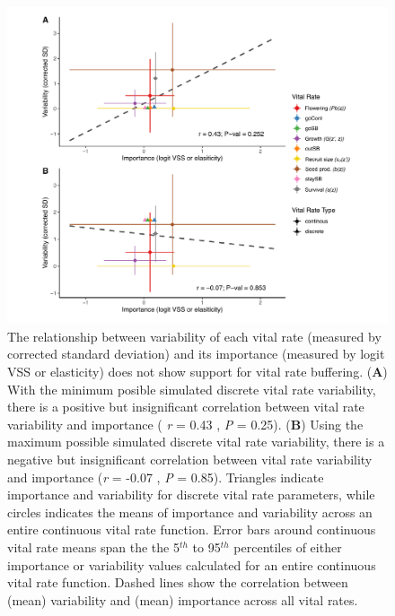 \documentclass[12pt, letterpaper]{article}
\begin{document}
\begin{figure}[h!]
  \centering
  \includegraphics[width=.9\textwidth]{figures/VRbufferingFigure.pdf}
  \caption{ \internallinenumbers The relationship between variability of each vital rate (measured by corrected standard deviation) and its importance (measured by logit VSS or elasticity) does not show support for vital rate buffering. (\textbf{A}) With the minimum posible simulated discrete vital rate variability, there is a positive but insignificant correlation between vital rate variability and importance ( \textit{r} = 0.43 , \textit{P} = 0.25). (\textbf{B}) Using the maximum possible simulated discrete vital rate variability, there is a negative but insignificant correlation between vital rate variability and importance (\textit{r} = -0.07 , \textit{P} = 0.85). Triangles indicate importance and variability for discrete vital rate parameters, while circles indicates the means of importance and variability across an entire continuous vital rate function. Error bars around continuous vital rate means span the the 5$^{th}$ to 95$^{th}$ percentiles of either importance or variability values calculated for an entire continuous vital rate function. Dashed lines show the correlation between (mean) variability and (mean) importance across all vital rates. }
  \label{fig:VRBuffering}
\end{figure} 
\end{document}
